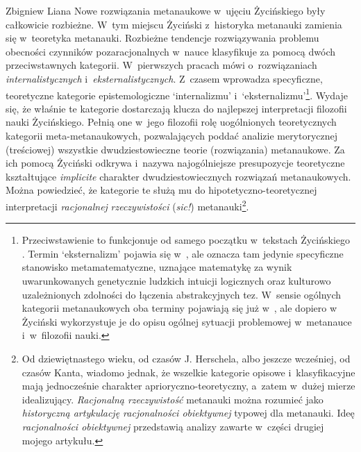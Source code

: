 \begin{artplenv}{Zbigniew Liana}
Nowe rozwiązania metanaukowe w~ujęciu Życińskiego były całkowicie rozbieżne. W~tym miejscu Życiński z~historyka
metanauki zamienia się w~teoretyka metanauki. Rozbieżne tendencje rozwiązywania problemu obecności czynników
pozaracjonalnych w~nauce klasyfikuje za pomocą dwóch przeciwstawnych kategorii. W~pierwszych pracach
mówi o~rozwiązaniach \textit{internalistycznych} i~\textit{eksternalistycznych}. Z~czasem wprowadza specyficzne, teoretyczne
kategorie epistemologiczne `internalizmu' i~`eksternalizmu'\footnote{Przeciwstawienie to funkcjonuje od samego
początku w~tekstach Życińskiego
\parencites*[s.~141nn]{zycinski_jezyk_1983}[s.~12.16]{zycinski_structure_1988}[s.~21.29]{zycinski_struktura_2013}.
Termin
`eksternalizm' pojawia się w~\parencite[s.~120n]{zycinski_teizm_1985},
ale oznacza tam
jedynie specyficzne stanowisko metamatematyczne, uznające matematykę za wynik uwarunkowanych genetycznie ludzkich
intuicji logicznych oraz kulturowo uzależnionych zdolności do łączenia abstrakcyjnych tez. W~sensie ogólnych kategorii
metanaukowych oba terminy pojawiają się już
w~\parencite*[s.~242]{zycinski_granice_1993},
ale dopiero
w~\parencite*[s.~133nn]{zycinski_elementy_1996}
Życiński wykorzystuje je do opisu ogólnej sytuacji problemowej w~metanauce i~w~filozofii nauki.}. Wydaje się, że
właśnie te kategorie dostarczają klucza do najlepszej interpretacji filozofii nauki Życińskiego. Pełnią one w~jego
filozofii rolę uogólnionych teoretycznych kategorii meta-metanaukowych, pozwalających poddać analizie merytorycznej
(treściowej) wszystkie dwudziestowieczne teorie (rozwiązania) metanaukowe. Za ich pomocą Życiński odkrywa i~nazywa
najogólniejsze presupozycje teoretyczne kształtujące \textit{implicite} charakter dwudziestowiecznych rozwiązań
metanaukowych. Można powiedzieć, że kategorie te służą mu do hipotetyczno-teoretycznej interpretacji \textit{racjonalnej}
\textit{rzeczywistości} (\textit{sic!}) metanauki\footnote{Od dziewiętnastego wieku, od czasów J. Herschela, albo jeszcze
wcześniej, od czasów Kanta, wiadomo jednak, że wszelkie kategorie opisowe i~klasyfikacyjne mają jednocześnie charakter
aprioryczno-teoretyczny, a~zatem w~dużej mierze idealizujący. \textit{Racjonalną rzeczywistość }metanauki można rozumieć
jako \textit{historyczną artykulację racjonalności obiektywnej} typowej dla metanauki. Ideę \textit{racjonalności
obiektywnej} przedstawią analizy zawarte w~części drugiej mojego artykułu.}.


\end{artplenv}
